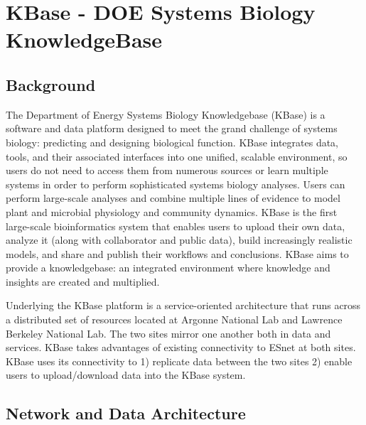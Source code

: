 \documentclass[10pt,a4paper]{report}
\begin{document}
\chapter{KBase - DOE Systems Biology KnowledgeBase}

\section{Background} 
The Department of Energy Systems Biology Knowledgebase (KBase) is a software and data platform designed to meet the grand challenge of systems biology: predicting and designing biological function. KBase integrates data, tools, and their associated interfaces into one unified, scalable environment, so users do not need to access them from numerous sources or learn multiple systems in order to perform sophisticated systems biology analyses. Users can perform large-scale analyses and combine multiple lines of evidence to model plant and microbial physiology and community dynamics.  KBase is the first large-scale bioinformatics system that enables users to upload their own data, analyze it (along with collaborator and public data), build increasingly realistic models, and share and publish their workflows and conclusions. KBase aims to provide a knowledgebase: an integrated environment where knowledge and insights are created and multiplied.

Underlying the KBase platform is a service-oriented architecture that runs across a distributed set of resources located at Argonne National Lab and Lawrence Berkeley National Lab.  The two sites mirror one another both in data and services.  KBase takes advantages of existing connectivity to ESnet at both sites.  KBase uses its connectivity to 1) replicate data between the two sites 2) enable users to upload/download data into the KBase system.

\section{Network and Data Architecture}
\end{document}
